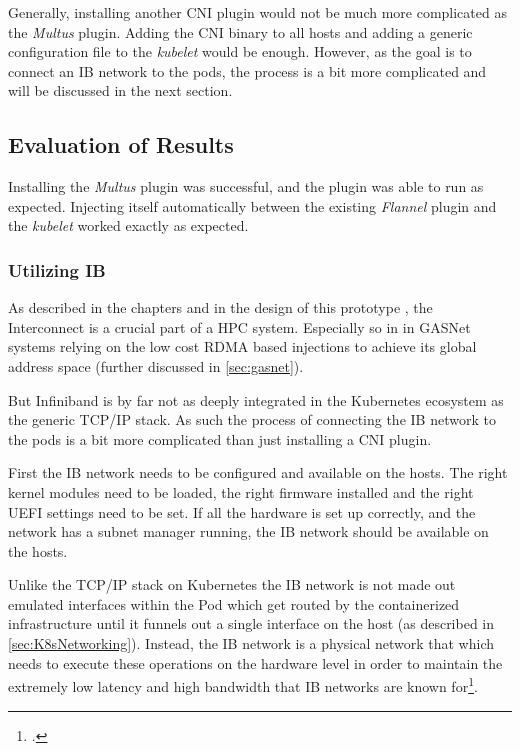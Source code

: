 Generally, installing another \ac{CNI} plugin would not be much more complicated as the \textit{Multus} plugin.
Adding the \ac{CNI} binary to all hosts and adding a generic configuration file to the \textit{kubelet} would be enough.
However, as the goal is to connect an \ac{IB} network to the pods, the process is a bit more complicated and will be discussed in the next section.

\pagebreak
\subsection{Evaluation of Results}

Installing the \textit{Multus} plugin was successful, and the plugin was able to run as expected.
Injecting itself automatically between the existing \textit{Flannel} plugin and the \textit{kubelet} worked exactly as expected.


\subsubsection{Utilizing \ac{IB}}

As described in the chapters  and in the design of this prototype ,
the Interconnect is a crucial part of a \ac{HPC} system.
Especially so in in \ac{GASNet} systems relying on the low cost \ac{RDMA} based injections to achieve its
global address space (further discussed in \ref{sec:gasnet}).

But Infiniband is by far not as deeply integrated in the Kubernetes ecosystem as the generic \ac{TCP/IP} stack.
As such the process of connecting the \ac{IB} network to the pods is a bit more complicated than just installing a \ac{CNI} plugin.

First the \ac{IB} network needs to be configured and available on the hosts.
The right kernel modules need to be loaded, the right firmware installed and the right \ac{UEFI} settings need to be set.
If all the hardware is set up correctly, and the network has a subnet manager running, the \ac{IB} network should be available on the hosts.

Unlike the \ac{TCP/IP} stack on Kubernetes the \ac{IB} network is not made out emulated
interfaces within the Pod which get routed by the containerized infrastructure until it funnels
out a single interface on the host (as described in \ref{sec:K8sNetworking}).
Instead, the \ac{IB} network is a physical network that
which needs to execute these operations on the hardware level in order to maintain the
extremely low latency and high bandwidth that \ac{IB} networks are known for\footcite{pfisterIntroductionInfiniBandArchitecturea}.

